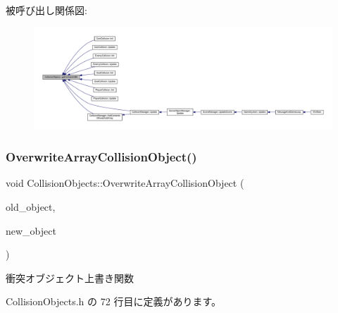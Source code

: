 被呼び出し関係図\+:
\nopagebreak
\begin{figure}[H]
\begin{center}
\leavevmode
\includegraphics[width=350pt]{class_collision_objects_aee138e1c28f7f3dcbdce56181d59b628_icgraph}
\end{center}
\end{figure}
\mbox{\label{class_collision_objects_aed8d6903485ae775d8bbff511796a653}} 
\subsubsection{\texorpdfstring{Overwrite\+Array\+Collision\+Object()}{OverwriteArrayCollisionObject()}}
{\footnotesize\ttfamily void Collision\+Objects\+::\+Overwrite\+Array\+Collision\+Object (\begin{DoxyParamCaption}\item[{\mbox{\hyperlink{class_collision_object}{Collision\+Object}} $\ast$}]{old\+\_\+object,  }\item[{\mbox{\hyperlink{class_collision_object}{Collision\+Object}} $\ast$}]{new\+\_\+object }\end{DoxyParamCaption})\hspace{0.3cm}{\ttfamily [inline]}}



衝突オブジェクト上書き関数 



 Collision\+Objects.\+h の 72 行目に定義があります。

